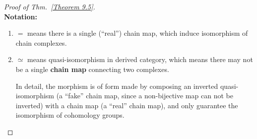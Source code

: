 \begin{proof}[Proof of Thm.~\ref{Theorem 9.5}]
    \mbox{}\\

    \textbf{Notation:}
    \begin{enumerate}
        \item $=$ means there is a single (``real'') chain map, which induce isomorphism of chain complexes.
        \item $\simeq$ means quasi-isomorphism in derived category,
              which means there may not be a single \textbf{chain map} connecting two complexes.

              In detail, the morphism is of form made by composing
              an inverted quasi-isomorphism (a ``fake'' chain map, since a non-bijective map can not be inverted)
              with a chain map (a ``real'' chain map),
              and only guarantee the isomorphism of cohomology groups.
    \end{enumerate}


\end{proof}
